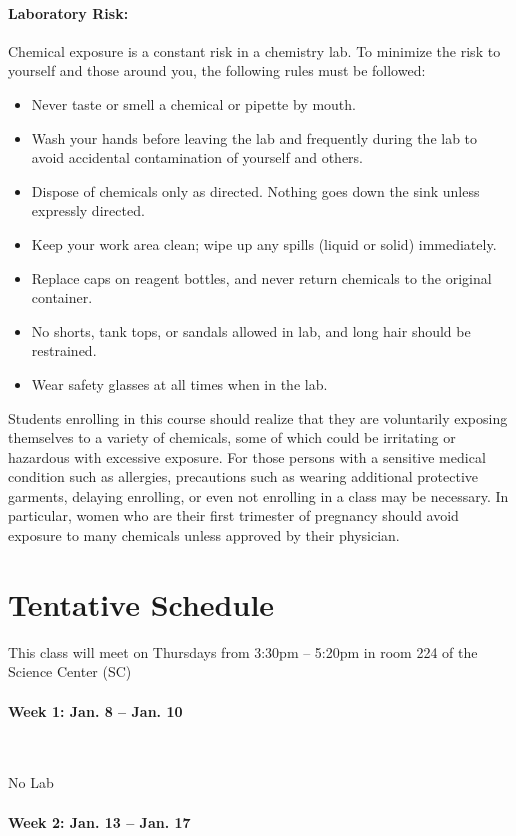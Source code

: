 \documentclass[12pt, letterpaper]{article}
\begin{document}
\paragraph{Laboratory Risk:}
Chemical exposure is a constant risk in a chemistry lab. To minimize the risk to yourself and those around you, the following rules must be followed:
\begin{itemize}
	\item Never taste or smell a chemical or pipette by mouth.
	\item Wash your hands before leaving the lab and frequently during the lab to avoid accidental contamination of yourself and others.
	\item Dispose of chemicals only as directed. Nothing goes down the sink unless expressly directed.
	\item Keep your work area clean; wipe up any spills (liquid or solid) immediately.
	\item Replace caps on reagent bottles, and never return chemicals to the original container.
	\item No shorts, tank tops, or sandals allowed in lab, and long hair should be restrained.
	\item Wear safety glasses at all times when in the lab.
\end{itemize}
Students enrolling in this course should realize that they are voluntarily exposing themselves to a variety of chemicals, some of which could be irritating or hazardous with excessive exposure.  For those persons with a sensitive medical condition such as allergies, precautions such as wearing additional protective garments, delaying enrolling, or even not enrolling in a class may be necessary.  In particular, women who are their first trimester of pregnancy should avoid exposure to many chemicals unless approved by their physician.

\section*{Tentative Schedule}
This class will meet on Thursdays from 3:30pm -- 5:20pm in room 224 of the Science Center (SC)

\paragraph{Week 1: Jan. 8 -- Jan. 10}~

No Lab

\paragraph{Week 2: Jan. 13 -- Jan. 17}~
\end{document}
